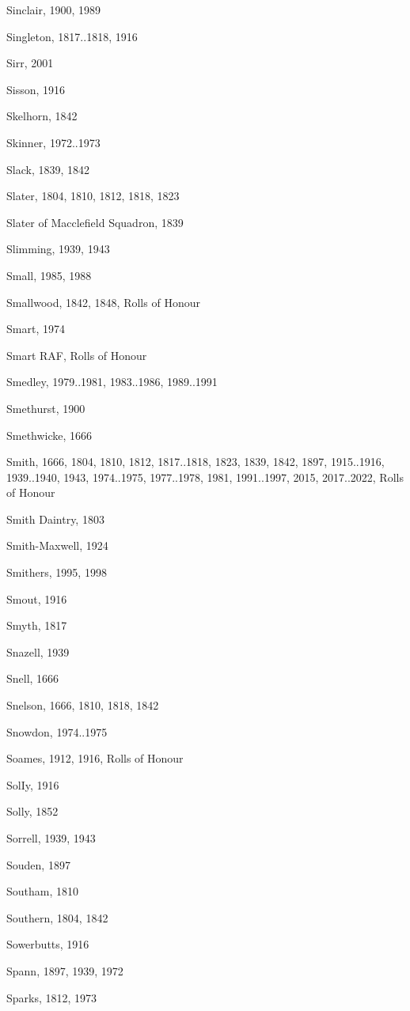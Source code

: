 \begin{theindex}
\item Sinclair, 1900, 1989
\item Singleton, 1817..1818, 1916
\item Sirr, 2001
\item Sisson, 1916
\item Skelhorn, 1842
\item Skinner, 1972..1973
\item Slack, 1839, 1842
\item Slater, 1804, 1810, 1812, 1818, 1823
\item Slater of Macclefield Squadron, 1839
\item Slimming, 1939, 1943
\item Small, 1985, 1988
\item Smallwood, 1842, 1848, Rolls of Honour
\item Smart, 1974
\item Smart RAF, Rolls of Honour
\item Smedley, 1979..1981, 1983..1986, 1989..1991
\item Smethurst, 1900
\item Smethwicke, 1666
\item Smith, 1666, 1804, 1810, 1812, 1817..1818, 1823, 1839, 1842, 1897, 1915..1916, 1939..1940, 1943, 1974..1975, 1977..1978, 1981, 1991..1997, 2015, 2017..2022, Rolls of Honour
\item Smith Daintry, 1803
\item Smith-Maxwell, 1924
\item Smithers, 1995, 1998
\item Smout, 1916
\item Smyth, 1817
\item Snazell, 1939
\item Snell, 1666
\item Snelson, 1666, 1810, 1818, 1842
\item Snowdon, 1974..1975
\item Soames, 1912, 1916, Rolls of Honour
\item SolIy, 1916
\item Solly, 1852
\item Sorrell, 1939, 1943
\item Souden, 1897
\item Southam, 1810
\item Southern, 1804, 1842
\item Sowerbutts, 1916
\item Spann, 1897, 1939, 1972
\item Sparks, 1812, 1973

\end{theindex}
